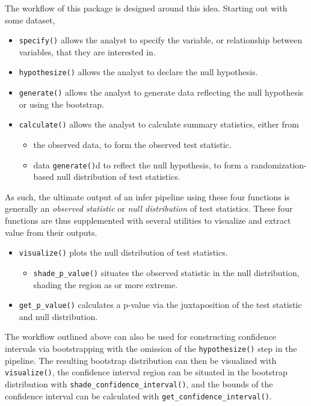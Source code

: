 \documentclass[10pt,a4paper,onecolumn]{article}
\providecommand{\tightlist}{%
  \setlength{\itemsep}{0pt}\setlength{\parskip}{0pt}}
\begin{document}
The workflow of this package is designed around this idea. Starting out
with some dataset,

\begin{itemize}
\tightlist
\item
  \texttt{specify()} allows the analyst to specify the variable, or
  relationship between variables, that they are interested in.
\item
  \texttt{hypothesize()} allows the analyst to declare the null
  hypothesis.
\item
  \texttt{generate()} allows the analyst to generate data reflecting the
  null hypothesis or using the bootstrap.
\item
  \texttt{calculate()} allows the analyst to calculate summary
  statistics, either from

  \begin{itemize}
  \tightlist
  \item
    the observed data, to form the observed test statistic.
  \item
    data \texttt{generate()}d to reflect the null hypothesis, to form a
    randomization-based null distribution of test statistics.
  \end{itemize}
\end{itemize}

As such, the ultimate output of an infer pipeline using these four
functions is generally an \emph{observed statistic} or \emph{null
distribution} of test statistics. These four functions are thus
supplemented with several utilities to visualize and extract value from
their outputs.

\begin{itemize}
\tightlist
\item
  \texttt{visualize()} plots the null distribution of test statistics.

  \begin{itemize}
  \tightlist
  \item
    \texttt{shade\_p\_value()} situates the observed statistic in the
    null distribution, shading the region as or more extreme.
  \end{itemize}
\item
  \texttt{get\_p\_value()} calculates a p-value via the juxtaposition of
  the test statistic and null distribution.
\end{itemize}

The workflow outlined above can also be used for constructing confidence
intervals via bootstrapping with the omission of the
\texttt{hypothesize()} step in the pipeline. The resulting bootstrap
distribution can then be visualized with \texttt{visualize()}, the
confidence interval region can be situated in the bootstrap distribution
with \texttt{shade\_confidence\_interval()}, and the bounds of the
confidence interval can be calculated with
\texttt{get\_confidence\_interval()}.
\end{document}

